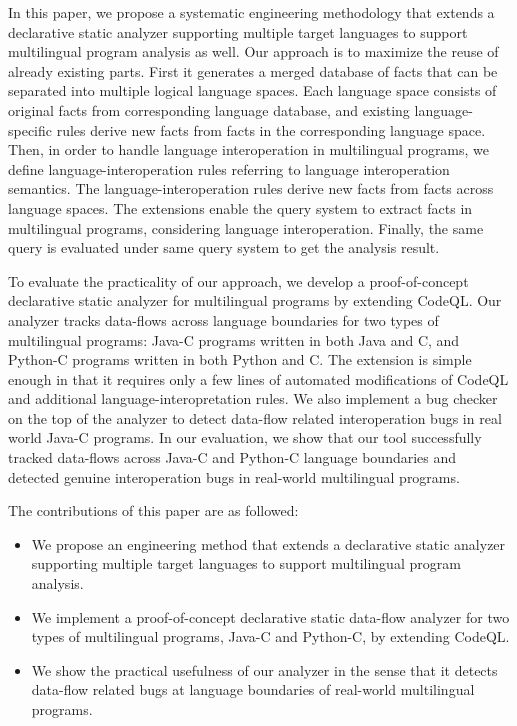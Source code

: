 In this paper, we propose a systematic engineering methodology that extends a
declarative static analyzer supporting multiple target languages to support
multilingual program analysis as well. Our approach is to maximize the reuse of
already existing parts. First it generates a merged database of facts that can
be separated into multiple logical language spaces.  Each language space
consists of original facts from corresponding language database, and existing
language-specific rules derive new facts from facts in the corresponding
language space. Then, in order to handle language interoperation in
multilingual programs, we define language-interoperation rules referring to
language interoperation semantics. The language-interoperation rules derive new
facts from facts across language spaces. The extensions enable the query system
to extract facts in multilingual programs, considering language interoperation.
Finally, the same query is evaluated under same query system to get the
analysis result.

To evaluate the practicality of our approach, we develop a proof-of-concept
declarative static analyzer for multilingual programs by extending CodeQL. Our
analyzer tracks data-flows across language boundaries for two types of
multilingual programs: Java-C programs written in both Java and C, and Python-C
programs written in both Python and C. The extension is simple enough in that
it requires only a few lines of automated modifications of CodeQL and additional
language-interopretation rules. We also implement a bug checker on the top of
the analyzer to detect data-flow related interoperation bugs in real world Java-C programs.
In our evaluation, we show that our tool successfully tracked data-flows across
Java-C and Python-C language boundaries and detected genuine interoperation
bugs in real-world multilingual programs.

The contributions of this paper are as followed:
\begin{itemize}
\item We propose an engineering method that extends a declarative static analyzer
supporting multiple target languages to support multilingual program analysis.

\item We implement a proof-of-concept declarative static data-flow analyzer for two
types of multilingual programs, Java-C and Python-C, by extending CodeQL.

\item We show the practical usefulness of our analyzer in the sense that it detects
data-flow related bugs at language boundaries of real-world multilingual
programs.
\end{itemize}
